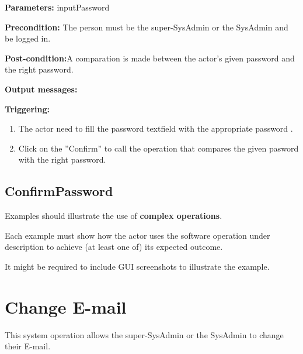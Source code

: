 \begin{description}

\item \textbf{Parameters:} inputPassword
\item \textbf{Precondition:} The person must be the super-SysAdmin or the
SysAdmin and be logged in.
\item \textbf{Post-condition:}A comparation is made between the actor's given
password and the right password.
\item \textbf{Output messages:} 


\item \textbf{Triggering:}
\begin{enumerate}
 \item The actor need to fill the password textfield with the appropriate
 password .
\item Click on the ''Confirm'' to call the operation that compares the given
pasword with the right password.

\end{enumerate}

 
\end{description}

 
\subsection{ConfirmPassword}
Examples should illustrate the use of \textbf{complex operations}.

Each example must show how the actor uses the software operation under
description to achieve (at least one of) its expected outcome.

It might be required to include GUI screenshots to illustrate the example.







\section{Change E-mail}
\label{operation:NewEmail}
This system operation allows the super-SysAdmin or the SysAdmin to change
their E-mail.

